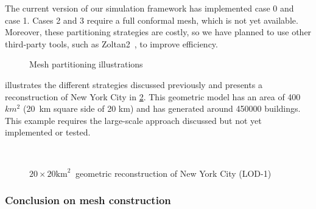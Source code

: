 \documentclass[runningheads]{llncs}
\begin{document}
The current version of our simulation framework has implemented case 0 and case 1. Cases 2 and 3 require a full conformal mesh, which is not yet available. Moreover, these partitioning strategies are costly, so we have planned to use other third-party tools, such as Zoltan2~\cite{the_zoltan2_team_zoltan2_nodate}, to improve efficiency.
\begin{figure}
\centering
{}\hspace{0.02\linewidth}
\caption{Mesh partitioning illustrations}
\label{fig:partitioning}
\end{figure}

 illustrates the different strategies discussed previously and presents a reconstruction of New York City in \cref{fig:city-ny-largescale}. This geometric model has an area of 400 $km^2$ (20 km square side of 20 km) and has generated around 450000 buildings. This example requires the large-scale approach discussed but not yet implemented or tested.

\begin{figure}[htbp]
\centering
{}
\hfill
{}\\
\hfill
{}
\caption{$20 \times 20 \mathrm{km}^2\ $ geometric reconstruction of New York City (LOD-1)}
\label{fig:city-ny-largescale}
\end{figure}


\subsubsection{Conclusion on mesh construction}
\end{document}
